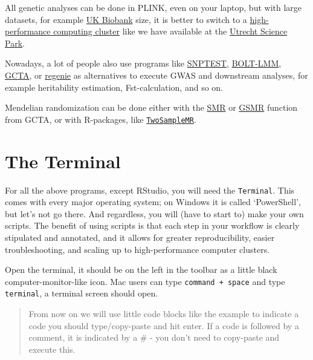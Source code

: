 \documentclass[
]{book}
\newcommand{\passthrough}[1]{#1}
\begin{document}
All genetic analyses can be done in PLINK, even on your laptop, but with large datasets, for example \href{https://www.ukbiobank.ac.uk}{UK Biobank} size, it is better to switch to a \href{https://en.wikipedia.org/wiki/High-performance_computing}{high-performance computing cluster} like we have available at the \href{https://wiki.bioinformatics.umcutrecht.nl/bin/view/HPC/WebHome}{Utrecht Science Park}.

Nowadays, a lot of people also use programs like \href{snptest}{SNPTEST}, \href{https://data.broadinstitute.org/alkesgroup/BOLT-LMM/}{BOLT-LMM}, \href{http://cnsgenomics.com/software/gcta/\#Overview}{GCTA}, or \href{https://rgcgithub.github.io/regenie/}{regenie} as alternatives to execute GWAS and downstream analyses, for example heritability estimation, Fst-calculation, and so on.

Mendelian randomization can be done either with the \href{http://cnsgenomics.com/software/smr/\#Overview}{SMR} or \href{http://cnsgenomics.com/software/gsmr/}{GSMR} function from GCTA, or with R-packages, like \href{https://mrcieu.github.io/TwoSampleMR/}{\passthrough{\lstinline!TwoSampleMR!}}.

\hypertarget{the-terminal}{%
\section{The Terminal}\label{the-terminal}}

For all the above programs, except RStudio, you will need the \passthrough{\lstinline!Terminal!}. This comes with every major operating system; on Windows it is called `PowerShell', but let's not go there. And regardless, you will (have to start to) make your own scripts. The benefit of using scripts is that each step in your workflow is clearly stipulated and annotated, and it allows for greater reproducibility, easier troubleshooting, and scaling up to high-performance computer clusters.

Open the terminal, it should be on the left in the toolbar as a little black computer-monitor-like icon.
Mac users can type \passthrough{\lstinline!command + space!} and type \passthrough{\lstinline!terminal!}, a terminal screen should open.

\begin{quote}
From now on we will use little code blocks like the example to indicate a code you should type/copy-paste and hit enter. If a code is followed by a comment, it is indicated by a \# - you don't need to copy-paste and execute this.
\end{quote}
\end{document}
